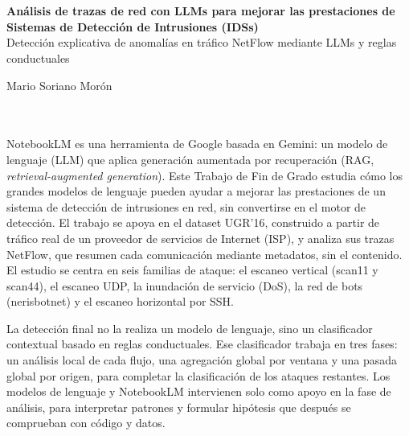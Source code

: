 \chapter*{}






\cleardoublepage
\thispagestyle{empty}

\begin{center}
{\large\bfseries Análisis de trazas de red con LLMs para mejorar las prestaciones de Sistemas de Detección de Intrusiones (IDSs)}\\[0.3cm]
{\normalsize Detección explicativa de anomalías en tráfico NetFlow mediante LLMs y reglas conductuales}\\
\end{center}
\begin{center}
Mario Soriano Morón\\
\end{center}

\\

\vspace{0.7cm}
\\

NotebookLM es una herramienta de Google basada en Gemini: un modelo de lenguaje (LLM) que aplica generación aumentada por recuperación (RAG, \emph{retrieval-augmented generation}). Este Trabajo de Fin de Grado estudia cómo los grandes modelos de lenguaje pueden ayudar a mejorar las prestaciones de un sistema de detección de intrusiones en red, sin convertirse en el motor de detección. El trabajo se apoya en el dataset UGR'16, construido a partir de tráfico real de un proveedor de servicios de Internet (ISP), y analiza sus trazas NetFlow, que resumen cada comunicación mediante metadatos, sin el contenido. El estudio se centra en seis familias de ataque: el escaneo vertical (scan11 y scan44), el escaneo UDP, la inundación de servicio (DoS), la red de bots (nerisbotnet) y el escaneo horizontal por SSH.

La detección final no la realiza un modelo de lenguaje, sino un clasificador contextual basado en reglas conductuales. Ese clasificador trabaja en tres fases: un análisis local de cada flujo, una agregación global por ventana y una pasada global por origen, para completar la clasificación de los ataques restantes. Los modelos de lenguaje y NotebookLM intervienen solo como apoyo en la fase de análisis, para interpretar patrones y formular hipótesis que después se comprueban con código y datos.

